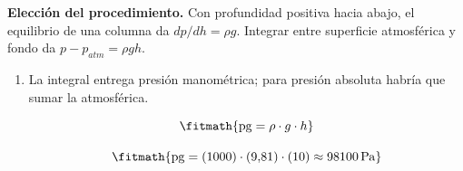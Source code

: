 \noindent\textbf{Elección del procedimiento.} Con profundidad positiva hacia abajo, el equilibrio de una columna da $dp/dh=\rho g$. Integrar entre superficie atmosférica y fondo da $p-p_{atm}=\rho gh$.

\begin{enumerate}

\item La integral entrega presión manométrica; para presión absoluta habría que sumar la atmosférica.

\[\fitmath{\mathrm{pg}=\rho\cdot g\cdot h}\]

\[\fitmath{\mathrm{pg}=(1000)\cdot (9{,}81)\cdot (10)\approx 98100\,\mathrm{Pa}}\]

\end{enumerate}
